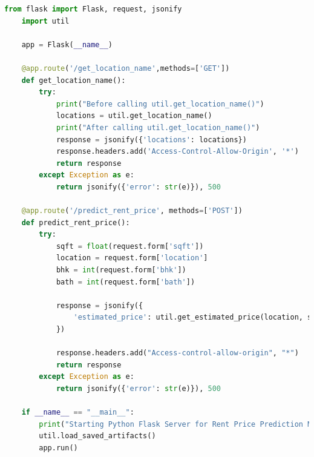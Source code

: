 \begin{lstlisting}[language=python]
    from flask import Flask, request, jsonify
    import util
     
    app = Flask(__name__)
     
    @app.route('/get_location_name',methods=['GET'])
    def get_location_name():
        try:
            print("Before calling util.get_location_name()")
            locations = util.get_location_name()
            print("After calling util.get_location_name()")
            response = jsonify({'locations': locations})
            response.headers.add('Access-Control-Allow-Origin', '*')
            return response
        except Exception as e:
            return jsonify({'error': str(e)}), 500
     
    @app.route('/predict_rent_price', methods=['POST'])
    def predict_rent_price():
        try:
            sqft = float(request.form['sqft'])
            location = request.form['location']
            bhk = int(request.form['bhk'])
            bath = int(request.form['bath'])
     
            response = jsonify({
                'estimated_price': util.get_estimated_price(location, sqft, bath, bhk)
            })
     
            response.headers.add("Access-control-allow-origin", "*")
            return response
        except Exception as e:
            return jsonify({'error': str(e)}), 500
     
    if __name__ == "__main__":
        print("Starting Python Flask Server for Rent Price Prediction Model")
        util.load_saved_artifacts()
        app.run() 
\end{lstlisting}